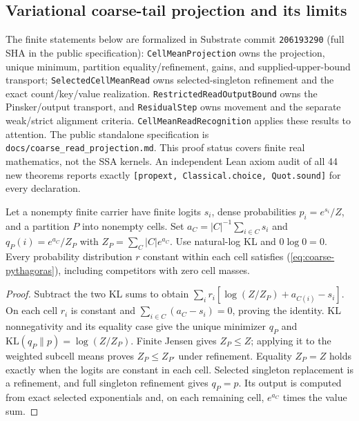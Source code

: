 \documentclass[11pt]{article}
\numberwithin{equation}{section}
\begin{document}
\subsection{Variational coarse-tail projection and its limits}\label{app:coarse-tail}

The finite statements below are formalized in Substrate commit
\texttt{206193290} (full SHA in the public specification): \texttt{CellMeanProjection} owns the projection,
unique minimum, partition equality/refinement, gains, and supplied-upper-bound transport;
\texttt{SelectedCellMeanRead} owns selected-singleton refinement and the exact count/key/value realization.
\texttt{RestrictedReadOutputBound} owns the Pinsker/output transport, and \texttt{ResidualStep} owns
movement and the separate weak/strict alignment criteria. \texttt{CellMeanReadRecognition} applies these
results to attention. The public standalone specification is \nolinkurl{docs/coarse_read_projection.md}.
This proof status covers finite real mathematics, not the SSA kernels.
An independent Lean axiom audit of all 44 new theorems reports exactly
\texttt{[propext, Classical.choice, Quot.sound]} for every declaration.

Let a nonempty finite carrier have finite logits $s_i$, dense probabilities $p_i=e^{s_i}/Z$, and a partition
$P$ into nonempty cells. Set $a_C=|C|^{-1}\sum_{i\in C}s_i$ and $q_P(i)=e^{a_C}/Z_P$ with
$Z_P=\sum_C|C|e^{a_C}$. Use natural-log KL and $0\log0=0$. Every probability distribution $r$ constant
within each cell satisfies (\ref{eq:coarse-pythagoras}), including competitors with zero cell masses.

\begin{proof}
Subtract the two KL sums to obtain
$\sum_i r_i[\log(Z/Z_P)+a_{C(i)}-s_i]$. On each cell $r_i$ is constant and
$\sum_{i\in C}(a_C-s_i)=0$, proving the identity. KL nonnegativity and its equality case give the unique
minimizer $q_P$ and $\mathrm{KL}(q_P\|p)=\log(Z/Z_P)$. Finite Jensen gives $Z_P\le Z$; applying it to
the weighted subcell means proves $Z_P\le Z_{P'}$ under refinement. Equality $Z_P=Z$ holds exactly when
the logits are constant in each cell. Selected singleton replacement is a refinement, and full singleton
refinement gives $q_P=p$. Its output is computed from exact selected exponentials and, on each remaining
cell, $e^{a_C}$ times the value sum.
\end{proof}
\end{document}
